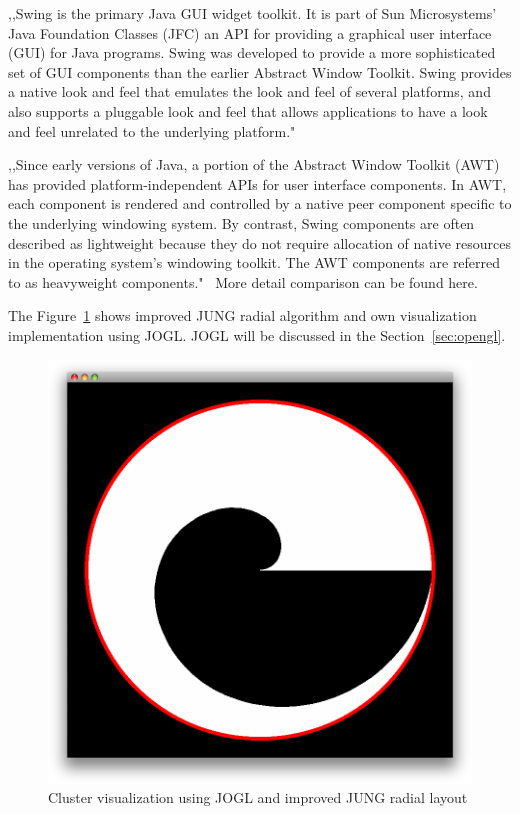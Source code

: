 ,,Swing is the primary Java GUI widget toolkit. It is part of Sun Microsystems' Java Foundation Classes (JFC) an API for providing a graphical user interface (GUI) for Java programs.
Swing was developed to provide a more sophisticated set of GUI components than the earlier Abstract Window Toolkit. Swing provides a native look and feel that emulates the look and feel of several platforms, and also supports a pluggable look and feel that allows applications to have a look and feel unrelated to the underlying platform."~\cite{JAVA_SWING}


,,Since early versions of Java, a portion of the Abstract Window Toolkit (AWT) has provided platform-independent APIs for user interface components. In AWT, each component is rendered and controlled by a native peer component specific to the underlying windowing system.
By contrast, Swing components are often described as lightweight because they do not require allocation of native resources in the operating system's windowing toolkit. The AWT components are referred to as heavyweight components."~\cite{JAVA_SWING} More detail comparison can be found here.~\cite{AWT_VS_SWING}


The Figure~\ref{fig:cluster_jogl_impl} shows improved JUNG radial algorithm and own visualization implementation using JOGL. JOGL will be discussed in the Section~\ref{sec:opengl}.


\begin{figure}[h!]
\centering
\includegraphics[scale=0.4]{pictures/cluster_jogl_impl.png}
\caption{Cluster visualization using JOGL and improved JUNG radial layout}
\label{fig:cluster_jogl_impl}
\end{figure}


